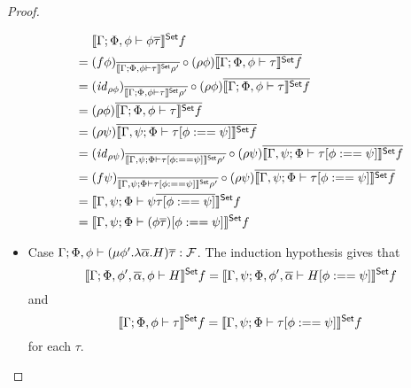 \documentclass[acmsmall,review,anonymous]{acmart}
\theoremstyle{definition}
\newcommand{\F}{\mathcal{F}}
\renewcommand{\id}{\mathit{id}}
\begin{document}
\begin{proof}
\begin{itemize}
    \begin{align*}
         & \setsem{\Gamma; \Phi, \phi \vdash \phi \ol\tau} f \\
      = \; & (f \phi)_{\ol{\setsem{\Gamma; \Phi, \phi \vdash \tau} \rho'}} 
              \circ (\rho \phi) \ol{\setsem{\Gamma; \Phi, \phi \vdash \tau} f} \\
      = \; & (\id_{\rho \phi})_{\ol{\setsem{\Gamma; \Phi, \phi \vdash \tau} \rho'}} 
              \circ (\rho \phi) \ol{\setsem{\Gamma; \Phi, \phi \vdash \tau} f} \\
      = \; & (\rho \phi) \ol{\setsem{\Gamma; \Phi, \phi \vdash \tau} f} \\
      = \; & (\rho \psi) \ol{\setsem{\Gamma, \psi; \Phi \vdash \tau[\phi :== \psi]} f} \\
      = \; & (\id_{\rho \psi})_{\ol{\setsem{\Gamma, \psi; \Phi \vdash \tau[\phi :== \psi]} \rho'}}
              \circ (\rho \psi) \ol{\setsem{\Gamma, \psi; \Phi \vdash \tau[\phi :== \psi]} f} \\
      = \; & (f \psi)_{\ol{\setsem{\Gamma, \psi; \Phi \vdash \tau[\phi :== \psi]} \rho'}}
              \circ (\rho \psi) \ol{\setsem{\Gamma, \psi; \Phi \vdash \tau[\phi :== \psi]} f} \\
      = \; & \setsem{\Gamma, \psi; \Phi \vdash \psi \ol{\tau[\phi :== \psi]}} f \\
      = \; & \setsem{\Gamma, \psi; \Phi \vdash (\phi \ol\tau) [\phi :== \psi]} f
    \end{align*}

  \item Case $\Gamma; \Phi, \phi \vdash (\mu \phi'. \lambda \ol\alpha. H)\ol\tau : \F$. 
      The induction hypothesis gives that 
      $$\llbracket{\Gamma; \Phi, \phi', \overline{\alpha}, \phi \vdash H }\rrbracket^{\mathsf{Set}} f
        = \llbracket{\Gamma, \psi; \Phi, \phi', \overline{\alpha} \vdash H[\phi :== \psi] }\rrbracket^{\mathsf{Set}} f$$ 
      and 
      $$\llbracket{\Gamma; \Phi, \phi \vdash \tau }\rrbracket^{\mathsf{Set}} f
        = \llbracket{\Gamma, \psi; \Phi \vdash \tau[\phi :== \psi] }\rrbracket^{\mathsf{Set}} f$$ 
      for each $\tau$. 


\end{itemize}
\end{proof}
\end{document}

